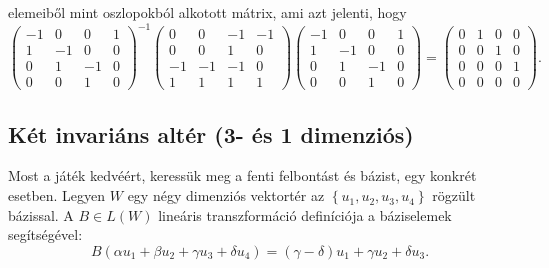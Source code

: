 \documentclass[9pt, a4paper, showtrims]{memoir}
\theoremstyle{plain}
\theoremstyle{remark}
\theoremstyle{definition}
\begin{document}
elemeiből mint oszlopokból alkotott mátrix, ami azt jelenti, hogy
\[
    \begin{pmatrix}
        -1&0&0&1\\
        1&-1&0&0\\
        0&1&-1&0\\
        0&0&1&0
    \end{pmatrix}^{-1}
    \begin{pmatrix}
        0 & 0 & -1&-1\\
        0 & 0 & 1 & 0\\
        -1 & -1& -1& 0\\
        1 & 1 & 1 & 1
    \end{pmatrix}
    \begin{pmatrix}
        -1&0&0&1\\
        1&-1&0&0\\
        0&1&-1&0\\
        0&0&1&0
    \end{pmatrix}
    =
    \begin{pmatrix}
        0&1&0&0\\
        0&0&1&0\\
        0&0&0&1\\
        0&0&0&0
    \end{pmatrix}.
\]
\subsection{Két invariáns altér (3- és 1 dimenziós)}
Most a játék kedvéért, keressük meg a fenti  felbontást és bázist, egy konkrét esetben.
Legyen $W$ egy négy dimenziós vektortér az $\left\{ u_1,u_2,u_3,u_4 \right\}$ rögzült bázissal.
A $B\in L\left( W \right)$ lineáris transzformáció definíciója a báziselemek segítségével:
\[
    B\left( \alpha u_1+\beta u_2 +\gamma u_3+\delta u_4 \right)
    =
    \left( \gamma-\delta \right)u_1+
    \gamma u_2+
    \delta u_3.
\]
\end{document}
